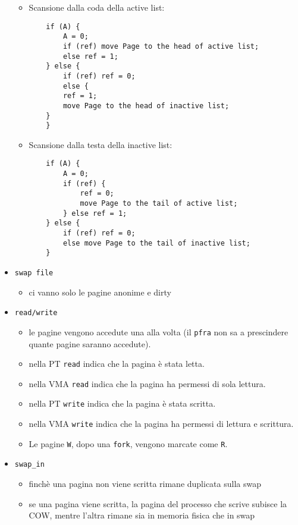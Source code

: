 \documentclass[12pt, a4paper]{report}
\begin{document}
\begin{itemize}
\begin{itemize}
			\item Scansione dalla coda della active list:
				\begin{verbatim}
    if (A) {
        A = 0;
        if (ref) move Page to the head of active list;
        else ref = 1;
    } else {
        if (ref) ref = 0;
        else {
	    ref = 1;
	    move Page to the head of inactive list;
	}
    }
				\end{verbatim}
			\item Scansione dalla testa della inactive list:
				\begin{verbatim}
    if (A) {
        A = 0;
        if (ref) {
            ref = 0;
            move Page to the tail of active list;
        } else ref = 1;
    } else {
        if (ref) ref = 0;
        else move Page to the tail of inactive list;
    }
				\end{verbatim}
		\end{itemize}
	\item \texttt{swap file}
		\begin{itemize}
			\item ci vanno solo le pagine anonime e dirty
		\end{itemize}
	\item \texttt{read/write}
		\begin{itemize}
			\item le pagine vengono accedute una alla volta (il \texttt{pfra}
				non sa a prescindere quante pagine saranno accedute).
			\item nella PT \texttt{read} indica che la pagina è stata letta.
			\item nella VMA \texttt{read} indica che la pagina ha permessi di
				sola lettura.
			\item nella PT \texttt{write} indica che la pagina è stata scritta.
			\item nella VMA \texttt{write} indica che la pagina ha permessi di
				lettura e scrittura.
			\item  Le pagine \texttt{W}, dopo una \texttt{fork}, vengono marcate
				come \texttt{R}.
		\end{itemize}
	\item \texttt{swap\_in}
		\begin{itemize}
			\item finchè una pagina non viene scritta rimane duplicata sulla
				swap
			\item se una pagina viene scritta, la pagina del processo che scrive
				subisce la COW, mentre l'altra rimane sia in memoria fisica che
				in swap

\end{itemize}
\end{itemize}
\end{document}
